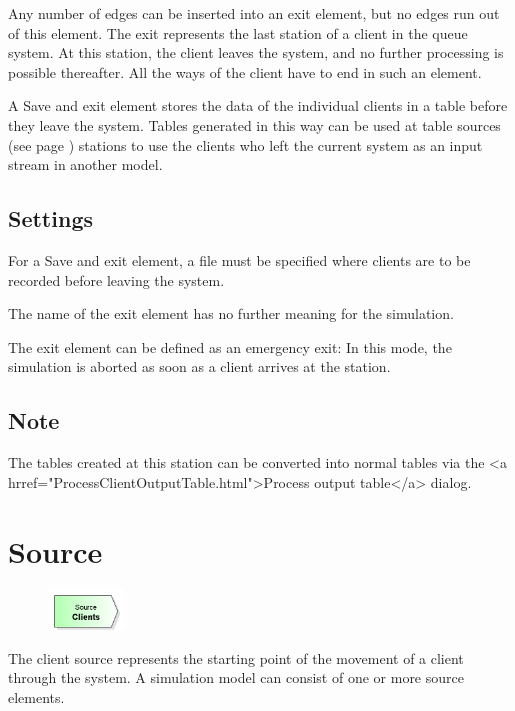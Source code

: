 Any number of edges can be inserted into an exit element, but no edges run out of this element.
The exit represents the last station of a client in the queue system.
At this station, the client leaves the system, and no further processing is possible thereafter.
All the ways of the client have to end in such an element.

A Save and exit element stores the data of the individual clients in a table before they leave the system.
Tables generated in this way can be used at table sources (see page \pageref{ref:ModelElementSourceTable}) stations
to use the clients who left the current system as an input stream in another model.

\subsection*{Settings}

For a Save and exit element, a file must be specified where clients are to be recorded before leaving the system.

The name of the exit element has no further meaning for the simulation.

The exit element can be defined as an emergency exit: In this mode, the simulation is aborted
as soon as a client arrives at the station.

\subsection*{Note}

The tables created at this station can be converted into normal tables via the <a hrref="ProcessClientOutputTable.html">Process output table</a> dialog.


\section{Source}
\label{ref:ModelElementSource}

\begin{figure}
\vspace{-22pt}
\includegraphics[width=2cm]{imageModelElementSource.png}
\vspace{-22pt}
\end{figure}

The client source represents the starting point of the movement of a client through the system.
A simulation model can consist of one or more source elements.

